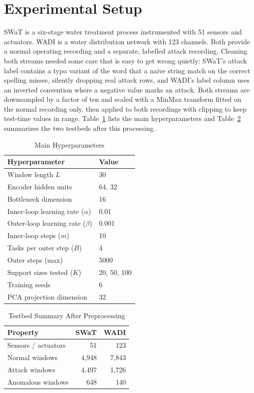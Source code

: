 \documentclass[conference]{IEEEtran}
\begin{document}
\section{Experimental Setup}
\label{sec:setup}

SWaT is a six-stage water treatment process instrumented with 51 sensors and
actuators. WADI is a water distribution network with 123 channels. Both
provide a normal operating recording and a separate, labelled attack
recording. Cleaning both streams needed some care that is easy to get wrong
quietly: SWaT's attack label contains a typo variant of the word that a
naive string match on the correct spelling misses, silently dropping real
attack rows, and WADI's label column uses an inverted convention where a
negative value marks an attack. Both streams are downsampled by a factor of
ten and scaled with a MinMax transform fitted on the normal recording only,
then applied to both recordings with clipping to keep test-time values in
range. Table~\ref{tab:hyper} lists the main hyperparameters and
Table~\ref{tab:testbeds} summarizes the two testbeds after this processing.

\begin{table}[t]
\caption{Main Hyperparameters}
\label{tab:hyper}
\centering
\footnotesize
\begin{tabular}{@{}ll@{}}
\toprule
Hyperparameter & Value \\
\midrule
Window length $L$ & 30 \\
Encoder hidden units & 64, 32 \\
Bottleneck dimension & 16 \\
Inner-loop learning rate ($\alpha$) & 0.01 \\
Outer-loop learning rate ($\beta$) & 0.001 \\
Inner-loop steps ($m$) & 10 \\
Tasks per outer step ($B$) & 4 \\
Outer steps (max) & 5000 \\
Support sizes tested ($K$) & 20, 50, 100 \\
Training seeds & 6 \\
PCA projection dimension & 32 \\
\bottomrule
\end{tabular}
\end{table}

\begin{table}[t]
\caption{Testbed Summary After Preprocessing}
\label{tab:testbeds}
\centering
\footnotesize
\begin{tabular}{@{}lrr@{}}
\toprule
Property & SWaT & WADI \\
\midrule
Sensors / actuators & 51 & 123 \\
Normal windows & 4,948 & 7,843 \\
Attack windows & 4,497 & 1,726 \\
Anomalous windows & 648 & 140 \\
\bottomrule
\end{tabular}
\end{table}
\end{document}
